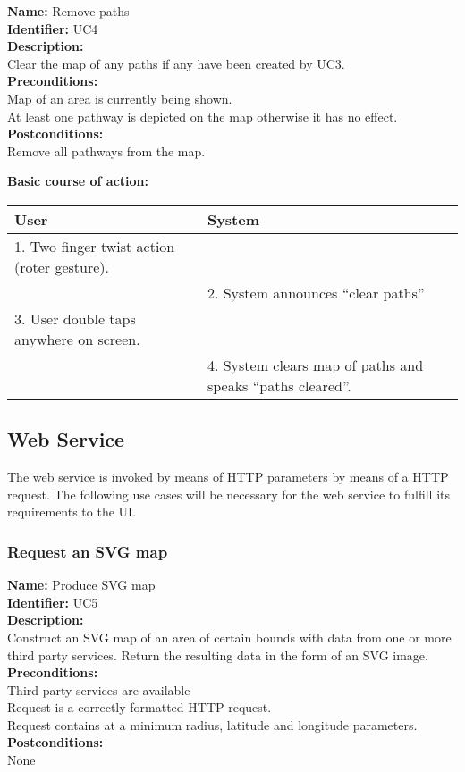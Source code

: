 \documentclass[11pt,twoside,a4paper]{article}
\begin{document}
\noindent
\textbf{Name:} Remove paths\\
\textbf{Identifier:} UC4\\
\textbf{Description:}\\
Clear the map of any paths if any have been created by UC3.\\
\textbf{Preconditions:}\\
Map of an area is currently being shown.\\
At least one pathway is depicted on the map otherwise it has no
effect.\\
\textbf{Postconditions:}\\
Remove all pathways from the map.

\noindent
\textbf{Basic course of action:}\\
\begin{tabularx}{\textwidth}{ |X|X| }
  \textbf{User} & \textbf{System}\\
  \hline
  1. Two finger twist action (roter gesture). & \\
  \hline
  & 2. System announces ``clear paths''\\
  \hline
  3. User double taps anywhere on screen. & \\
  \hline
  & 4. System clears map of paths and speaks ``paths cleared''.\\
  \hline
\end{tabularx}

\subsection{Web Service}

The web service is invoked by means of HTTP parameters by means of a
HTTP request. The following use cases will be necessary for the web
service to fulfill its requirements to the UI.

\subsubsection{Request an SVG map}
\noindent
\textbf{Name:} Produce SVG map\\
\textbf{Identifier:} UC5\\
\textbf{Description:}\\
Construct an SVG map of an area of certain bounds with data from one or
more third party services. Return the resulting data in the form of an
SVG image.\\
\textbf{Preconditions:}\\
Third party services are available\\
Request is a correctly formatted HTTP request.\\
Request contains at a minimum radius, latitude and longitude parameters.\\
\textbf{Postconditions:}\\
None\\
\end{document}
